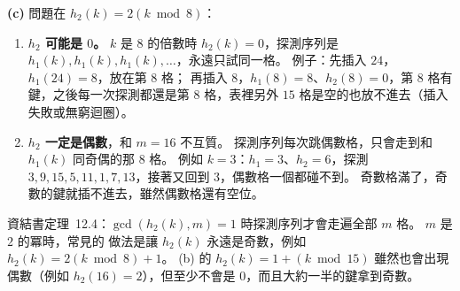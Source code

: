 \begin{pastsoln}
\textbf{(c)} 問題在 $h_2(k) = 2(k \bmod 8)$：
\begin{enumerate}
\item \textbf{$h_2$ 可能是 $0$。} $k$ 是 $8$ 的倍數時 $h_2(k) = 0$，探測序列是
$h_1(k), h_1(k), h_1(k), \ldots$，永遠只試同一格。 例子：先插入 $24$，$h_1(24) = 8$，放在第 $8$ 格；
再插入 $8$，$h_1(8) = 8$、$h_2(8) = 0$，第 $8$ 格有鍵，之後每一次探測都還是第 $8$ 格，表裡另外
$15$ 格是空的也放不進去（插入失敗或無窮迴圈）。
\item \textbf{$h_2$ 一定是偶數}，和 $m = 16$ 不互質。 探測序列每次跳偶數格，只會走到和 $h_1(k)$
同奇偶的那 $8$ 格。 例如 $k = 3$：$h_1 = 3$、$h_2 = 6$，探測 $3, 9, 15, 5, 11, 1, 7, 13$，接著又回到
$3$，偶數格一個都碰不到。 奇數格滿了，奇數的鍵就插不進去，雖然偶數格還有空位。
\end{enumerate}
資結書定理~12.4：$\gcd(h_2(k), m) = 1$ 時探測序列才會走遍全部 $m$ 格。 $m$ 是 $2$ 的冪時，常見的
做法是讓 $h_2(k)$ 永遠是奇數，例如 $h_2(k) = 2(k \bmod 8) + 1$。 (b) 的 $h_2(k) = 1 + (k \bmod 15)$
雖然也會出現偶數（例如 $h_2(16) = 2$），但至少不會是 $0$，而且大約一半的鍵拿到奇數。
\end{pastsoln}
